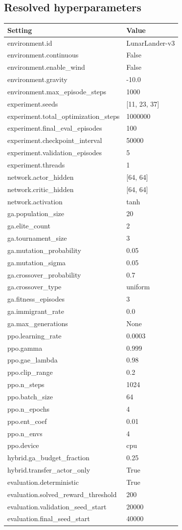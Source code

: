 \documentclass[11pt,a4paper]{article}
\begin{document}
\subsection*{Resolved hyperparameters}
\begingroup\small
\begin{longtable}{p{}p{}}
\toprule
Setting & Value \\
\midrule\endhead
environment.id & LunarLander-v3 \\
environment.continuous & False \\
environment.enable\_wind & False \\
environment.gravity & -10.0 \\
environment.max\_episode\_steps & 1000 \\
experiment.seeds & [11, 23, 37] \\
experiment.total\_optimization\_steps & 1000000 \\
experiment.final\_eval\_episodes & 100 \\
experiment.checkpoint\_interval & 50000 \\
experiment.validation\_episodes & 5 \\
experiment.threads & 1 \\
network.actor\_hidden & [64, 64] \\
network.critic\_hidden & [64, 64] \\
network.activation & tanh \\
ga.population\_size & 20 \\
ga.elite\_count & 2 \\
ga.tournament\_size & 3 \\
ga.mutation\_probability & 0.05 \\
ga.mutation\_sigma & 0.05 \\
ga.crossover\_probability & 0.7 \\
ga.crossover\_type & uniform \\
ga.fitness\_episodes & 3 \\
ga.immigrant\_rate & 0.0 \\
ga.max\_generations & None \\
ppo.learning\_rate & 0.0003 \\
ppo.gamma & 0.999 \\
ppo.gae\_lambda & 0.98 \\
ppo.clip\_range & 0.2 \\
ppo.n\_steps & 1024 \\
ppo.batch\_size & 64 \\
ppo.n\_epochs & 4 \\
ppo.ent\_coef & 0.01 \\
ppo.n\_envs & 4 \\
ppo.device & cpu \\
hybrid.ga\_budget\_fraction & 0.25 \\
hybrid.transfer\_actor\_only & True \\
evaluation.deterministic & True \\
evaluation.solved\_reward\_threshold & 200 \\
evaluation.validation\_seed\_start & 20000 \\
evaluation.final\_seed\_start & 40000 \\
\bottomrule\end{longtable}
\end{document}
